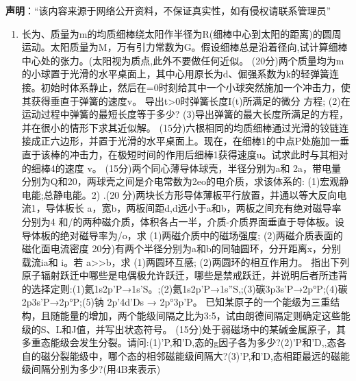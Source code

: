 

\textbf{声明}：“该内容来源于网络公开资料，不保证真实性，如有侵权请联系管理员”

\begin{enumerate}
\item 长为、质量为m的均质细棒绕太阳作半径为R(细棒中心到太阳的距离)的圆周运动。太阳质量为M，万有引力常数为G。假设细棒总是沿着径向,试计算细棒中心处的张力。(太阳视为质点,此外不要做任何近似。
(20分)两个质量均为m的小球置于光滑的水平桌面上，其中心用原长为d、倔强系数为k的轻弹簧连接。初始时体系静止，然后在=0时刻给其中一个小球突然施加一个冲击力，使其获得垂直于弹簧的速度v。
导出t>0时弹簧长度I(t)所满足的微分
方程;
(2)在运动过程中弹簧的最短长度等于多少?
(3)导出弹簧的最大长度所满足的方程，并在很小的情形下求其近似解。
(15分)六根相同的均质细棒通过光滑的铰链连接成正六边形，并置于光滑的水平桌面上。现在，在细棒1的中点P处施加一垂直于该棒的冲击力，在极短时间的作用后细棒1获得速度u。试求此时与其相对的细棒4的速度 v。
(15分)两个同心薄导体球壳，半径分别为a和 2a，带电量分别为Q和20，两球壳之间是介电常数为2eo的电介质，求该体系的:
(1)宏观静电能;总静电能。2)
.(20 分)两块长方形导体薄板平行放置，并通以等大反向电流1，导体板长 a，宽b，两板间距d,d远小于a和b，两板之间充有绝对磁导率分别为4 和/的两种磁介质，体积各占一半，介质-介质界面垂直于导体板。设导体板的绝对磁导率为/o，求
(1)两磁介质中的磁场强度;
(2)两磁介质表面的磁化面电流密度
20分)有两个半径分别为a和b的同轴圆环，分开距离x，分别载流ia和 i。若 a>>b，求
(1)两圆环互感;
(2)两圆环的相互作用力。
指出下列原子辐射跃迁中哪些是电偶极允许跃迁，哪些是禁戒跃迁，并说明后者所违背的选择定则:(1)氦1s2p'P→1s'S。;(2)氦1s2p’P→1s''S,;(3)碳3p3s’P→2p°P;(4)碳2p3s’P→2p°P;(5)钠 2p'4d’Ds → 2p°3p’P。
已知某原子的一个能级为三重结构，且随能量的增加，两个能级间隔之比为3:5，试由朗德间隔定则确定这些能级的S、L和J值，并写出状态符号。
(15分)处于弱磁场中的某碱金属原子，其多重态能级会发生分裂。请问:(1)'P,和'D,态的g因子各为多少?(2)'P和'D,,态各自的磁分裂能级中，哪个态的相邻磁能级间隔大?(3)’P,和'D,态相距最远的磁能级间隔分别为多少?(用4B来表示)
\end{enumerate}